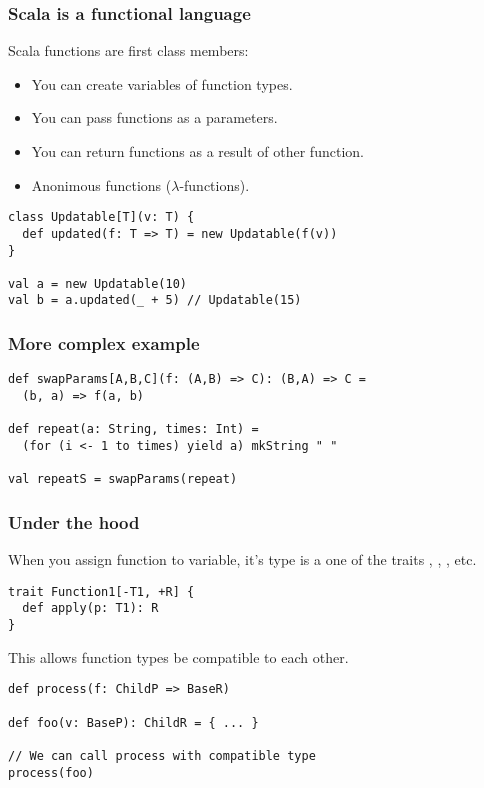 \documentclass{beamer}
\begin{document}
\begin{frame}[fragile]
\frametitle{Scala is a functional language}
  Scala functions are first class members:
  \begin{itemize}
    \item You can create variables of function types.
    \item You can pass functions as a parameters.
    \item You can return functions as a result of other function.
    \item Anonimous functions ($\lambda$-functions).
  \end{itemize}
  \begin{example}
\begin{lstlisting}
class Updatable[T](v: T) {
  def updated(f: T => T) = new Updatable(f(v))
}

val a = new Updatable(10)
val b = a.updated(_ + 5) // Updatable(15)
\end{lstlisting}
  \end{example}
\end{frame}

\begin{frame}[fragile]
\frametitle{More complex example}

    \begin{lstlisting}
def swapParams[A,B,C](f: (A,B) => C): (B,A) => C = 
  (b, a) => f(a, b)

def repeat(a: String, times: Int) = 
  (for (i <- 1 to times) yield a) mkString " "

val repeatS = swapParams(repeat)
    \end{lstlisting}

\end{frame}

\begin{frame}[fragile]
\frametitle{Under the hood}

When you assign function to variable, it's type is a one of the traits , , , etc.
\begin{lstlisting}
trait Function1[-T1, +R] {
  def apply(p: T1): R
}
\end{lstlisting}
This allows function types be compatible to each other.
\begin{example}
\begin{lstlisting}
def process(f: ChildP => BaseR)

def foo(v: BaseP): ChildR = { ... }

// We can call process with compatible type
process(foo)
\end{lstlisting}
\end{example}

\end{frame}
\end{document}
